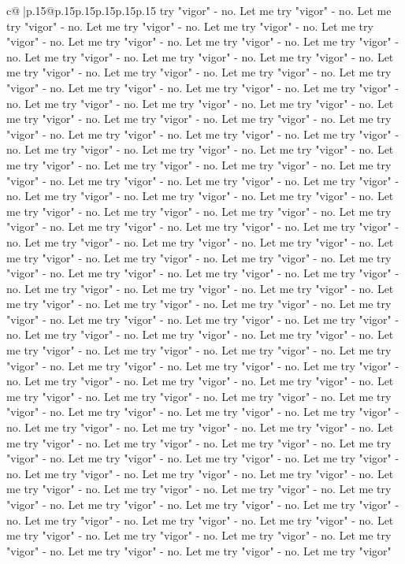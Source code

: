 \documentclass{article}
\begin{document}
{\begin{supertabular}{c@{$\;$}|p{.15\linewidth}@{}p{.15\linewidth}p{.15\linewidth}p{.15\linewidth}p{.15\linewidth}p{.15\linewidth}}
{{{try "vigor" {-} no. Let me try "vigor" {-} no. Let me try "vigor" {-} no. Let me try "vigor" {-} no. Let me try "vigor" {-} no. Let me try "vigor" {-} no. Let me try "vigor" {-} no. Let me try "vigor" {-} no. Let me try "vigor" {-} no. Let me try "vigor" {-} no. Let me try "vigor" {-} no. Let me try "vigor" {-} no. Let me try "vigor" {-} no. Let me try "vigor" {-} no. Let me try "vigor" {-} no. Let me try "vigor" {-} no. Let me try "vigor" {-} no. Let me try "vigor" {-} no. Let me try "vigor" {-} no. Let me try "vigor" {-} no. Let me try "vigor" {-} no. Let me try "vigor" {-} no. Let me try "vigor" {-} no. Let me try "vigor" {-} no. Let me try "vigor" {-} no. Let me try "vigor" {-} no. Let me try "vigor" {-} no. Let me try "vigor" {-} no. Let me try "vigor" {-} no. Let me try "vigor" {-} no. Let me try "vigor" {-} no. Let me try "vigor" {-} no. Let me try "vigor" {-} no. Let me try "vigor" {-} no. Let me try "vigor" {-} no. Let me try "vigor" {-} no. Let me try "vigor" {-} no. Let me try "vigor" {-} no. Let me try "vigor" {-} no. Let me try "vigor" {-} no. Let me try "vigor" {-} no. Let me try "vigor" {-} no. Let me try "vigor" {-} no. Let me try "vigor" {-} no. Let me try "vigor" {-} no. Let me try "vigor" {-} no. Let me try "vigor" {-} no. Let me try "vigor" {-} no. Let me try "vigor" {-} no. Let me try "vigor" {-} no. Let me try "vigor" {-} no. Let me try "vigor" {-} no. Let me try "vigor" {-} no. Let me try "vigor" {-} no. Let me try "vigor" {-} no. Let me try "vigor" {-} no. Let me try "vigor" {-} no. Let me try "vigor" {-} no. Let me try "vigor" {-} no. Let me try "vigor" {-} no. Let me try "vigor" {-} no. Let me try "vigor" {-} no. Let me try "vigor" {-} no. Let me try "vigor" {-} no. Let me try "vigor" {-} no. Let me try "vigor" {-} no. Let me try "vigor" {-} no. Let me try "vigor" {-} no. Let me try "vigor" {-} no. Let me try "vigor" {-} no. Let me try "vigor" {-} no. Let me try "vigor" {-} no. Let me try "vigor" {-} no. Let me try "vigor" {-} no. Let me try "vigor" {-} no. Let me try "vigor" {-} no. Let me try "vigor" {-} no. Let me try "vigor" {-} no. Let me try "vigor" {-} no. Let me try "vigor" {-} no. Let me try "vigor" {-} no. Let me try "vigor" {-} no. Let me try "vigor" {-} no. Let me try "vigor" {-} no. Let me try "vigor" {-} no. Let me try "vigor" {-} no. Let me try "vigor" {-} no. Let me try "vigor" {-} no. Let me try "vigor" {-} no. Let me try "vigor" {-} no. Let me try "vigor" {-} no. Let me try "vigor" {-} no. Let me try "vigor" {-} no. Let me try "vigor" {-} no. Let me try "vigor" {-} no. Let me try "vigor" {-} no. Let me try "vigor" {-} no. Let me try "vigor" {-} no. Let me try "vigor" {-} no. Let me try "vigor" {-} no. Let me try "vigor" {-} no. Let me try "vigor" {-} no. Let me try "vigor" {-} no. Let me try "vigor" {-} no. Let me try "vigor" {-} no. Let me try "vigor" {-} no. Let me try "vigor" {-} no. Let me try "vigor" {-} no. Let me try "vigor" {-} no. Let me try "vigor" {-} no. Let me try "vigor" {-} no. Let me try "vigor" {-} no. Let me try "vigor" {-} no. Let me try "vigor" {-} no. Let me try "vigor" {-} no. Let me try "vigor" {-} no. Let me try "vigor" {-} no. Let me try "vigor" {-} no. Let me try "vigor" }}}
\end{supertabular}}
\end{document}
